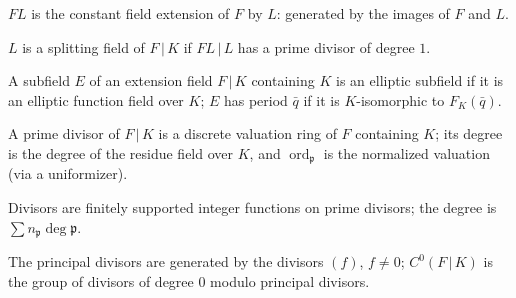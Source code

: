 \begin{definition}
\label{def:constant-extension}
\leanok
$FL$ is the constant field extension of $F$ by $L$: generated by the images of $F$ and $L$.
\end{definition}

\begin{definition}
\label{def:splitting-field}
\leanok
$L$ is a splitting field of $F\,|\,K$ if $FL\,|\,L$ has a prime divisor of degree $1$.
\end{definition}

\begin{definition}
\label{def:elliptic-subfield}
\leanok
A subfield $E$ of an extension field $F\,|\,K$ containing $K$ is an elliptic subfield if it is an elliptic function field over $K$; $E$ has period $\bar q$ if it is $K$-isomorphic to $F_K(\bar q)$.
\end{definition}

\begin{definition}
\label{def:prime-divisor}
\leanok
A prime divisor of $F\,|\,K$ is a discrete valuation ring of $F$ containing $K$; its degree is the degree of the residue field over $K$, and $\operatorname{ord}_{\mathfrak p}$ is the normalized valuation (via a uniformizer).
\end{definition}

\begin{definition}
\label{def:divisor-ff}
\leanok
Divisors are finitely supported integer functions on prime divisors; the degree is $\sum n_{\mathfrak p}\deg\mathfrak p$.
\end{definition}

\begin{definition}
\label{def:principal-divisor-ff}
\leanok
The principal divisors are generated by the divisors $(f)$, $f\ne 0$; $C^0(F\,|\,K)$ is the group of divisors of degree $0$ modulo principal divisors.
\end{definition}

